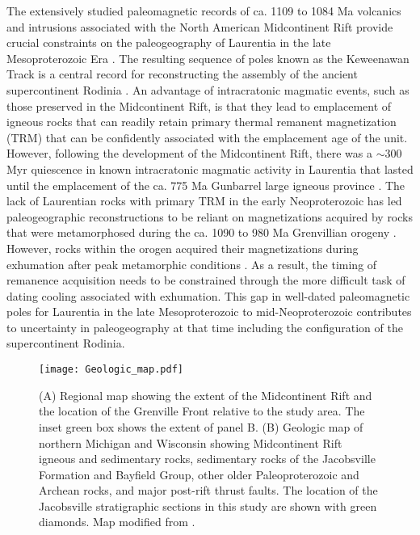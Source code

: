 The extensively studied paleomagnetic records of ca. 1109 to 1084 Ma volcanics and intrusions associated with the North American Midcontinent Rift provide crucial constraints on the paleogeography of Laurentia in the late Mesoproterozoic Era \cite{Halls1982a, Fairchild2017a, Swanson-Hysell2019a}. The resulting sequence of poles known as the Keweenawan Track is a central record for reconstructing the assembly of the ancient supercontinent Rodinia \cite{Evans2021b}. An advantage of intracratonic magmatic events, such as those preserved in the Midcontinent Rift, is that they lead to emplacement of igneous rocks that can readily retain primary thermal remanent magnetization (TRM) that can be confidently associated with the emplacement age of the unit. However, following the development of the Midcontinent Rift, there was a $\sim$300 Myr quiescence in known intracratonic magmatic activity in Laurentia that lasted until the emplacement of the ca. 775 Ma Gunbarrel large igneous province \cite{Harlan2003a, Mackinder2019a, Swanson-Hysell2021c}. The lack of Laurentian rocks with primary TRM in the early Neoproterozoic has led paleogeographic reconstructions to be reliant on magnetizations acquired by rocks that were metamorphosed during the ca. 1090 to 980 Ma Grenvillian orogeny \cite{Rivers2008a, Rivers2012a, Swanson-Hysell2023a}. However, rocks within the orogen acquired their magnetizations during exhumation after peak metamorphic conditions \cite{McWilliams1975a}. As a result, the timing of remanence acquisition needs to be constrained through the more difficult task of dating cooling associated with exhumation. This gap in well-dated paleomagnetic poles for Laurentia in the late Mesoproterozoic to mid-Neoproterozoic contributes to uncertainty in paleogeography at that time including the configuration of the supercontinent Rodinia.

\begin{figure*}[h!]
\centering
\texttt{[image: Geologic\_map.pdf]}
\caption{(A) Regional map showing the extent of the Midcontinent Rift and the location of the Grenville Front relative to the study area. The inset green box shows the extent of panel B. (B) Geologic map of northern Michigan and Wisconsin showing Midcontinent Rift igneous and sedimentary rocks, sedimentary rocks of the Jacobsville Formation and Bayfield Group, other older Paleoproterozoic and Archean rocks, and major post-rift thrust faults. The location of the Jacobsville stratigraphic sections in this study are shown with green diamonds. Map modified from .}
\label{fig:Geologic_map}
\end{figure*}

